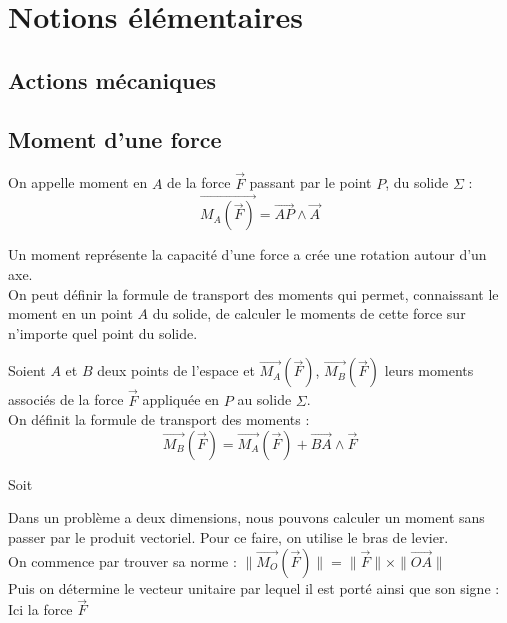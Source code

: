 \chapter{Notions élémentaires}
\section{Actions mécaniques}
\section{Moment d'une force}
\begin{defi}
On appelle moment en $A$ de la force $\overrightarrow{F}$ passant par le point $P$, du solide $\Sigma$ :
$$\overrightarrow{M_{A}(\overrightarrow{F})}=\overrightarrow{AP}\land\overrightarrow{A}$$
\end{defi}
Un moment représente la capacité d'une force a crée une rotation autour d'un axe.\\
On peut définir la formule de transport des moments qui permet, connaissant le moment en un point $A$ du solide, de calculer le moments de cette force sur n'importe quel point du solide.
\begin{prop}
Soient $A$ et $B$ deux points de l'espace et $\overrightarrow{M_{A}}(\overrightarrow{F})$, $\overrightarrow{M_{B}}(\overrightarrow{F})$ leurs moments associés de la force $\overrightarrow{F}$ appliquée en $P$ au solide $\Sigma$.\\
On définit la formule de transport des moments :
$$\overrightarrow{M_{B}}(\overrightarrow{F})=\overrightarrow{M_{A}}(\overrightarrow{F})+\overrightarrow{BA}\land\overrightarrow{F}$$
\end{prop}
\begin{demo}
Soit
\end{demo}
\begin{meth}
Dans un problème a deux dimensions, nous pouvons calculer un moment sans passer par le produit vectoriel. Pour ce faire, on utilise le bras de levier.\\
On commence par trouver sa norme : $\|\overrightarrow{M_O}(\overrightarrow{F})\|=\|\overrightarrow{F}\|\times\|\overrightarrow{OA}\|$\\
Puis on détermine le vecteur unitaire par lequel il est porté ainsi que son signe :\\
Ici la force $\overrightarrow{F}$
\end{meth}